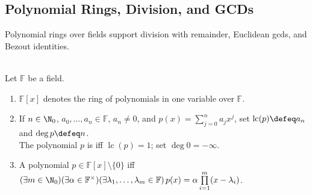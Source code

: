 \subsection{Polynomial Rings, Division, and GCDs}

Polynomial rings over fields support division with remainder, Euclidean gcds, and Bezout identities.

\begin{definition} \label{def:polynomial-degree-monic-splitting} \\
Let $\mathbb{F}$ be a field.
\begin{enumerate}[label=(\roman*)]
\setlength{\itemsep}{0pt}
\item $\mathbb{F}[x]$ denotes the ring of polynomials in one variable over $\mathbb{F}$.
\item If $n\in\N_0$, $a_0,\ldots,a_n\in\mathbb{F}$, $a_n\neq0$, and $p(x)=\sum\limits_{j=0}^{n}a_jx^j$, set $\operatorname{lc}(p)\defeq a_n$ and $\deg p\defeq n$.\\
The polynomial $p$ is  iff $\operatorname{lc}(p)=1$; set $\deg0=-\infty$.
\item A polynomial $p\in\mathbb{F}[x]\setminus\{0\}$  iff $(\exists m\in\N_0)(\exists \alpha\in\mathbb{F}^\times)(\exists \lambda_1,\ldots,\lambda_m\in\mathbb{F})\,p(x)=\alpha\prod\limits_{i=1}^{m}(x-\lambda_i)$.
\end{enumerate}
\end{definition}

